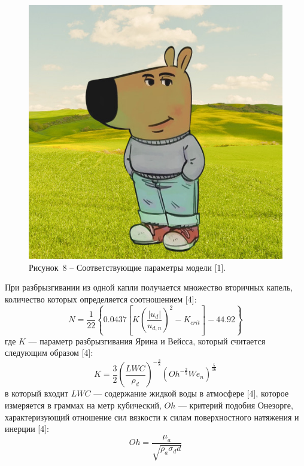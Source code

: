\begin{figure}[H]
	\centering
	\includegraphics[width=\textwidth]{figures/chill-guy.jpeg}
	\caption*{Рисунок~8 – Соответствующие параметры модели [1].}
	\label{fig:-6}
\end{figure}

При разбрызгивании из одной капли получается множество вторичных капель, количество которых определяется соотношением [4]:
\begin{equation}
	N = \frac{1}{22}\left\{0.0437\left[K\left(\frac{\left|u_d\right|}{u_{d,n}}\right)^2-K_{crit}\right]-44.92\right\}
\end{equation}  
где $K$ --- параметр разбрызгивания Ярина и Вейсса, который считается следующим образом [4]:
\begin{equation}
	K = \frac{3}{2}\left(\frac{LWC}{\rho_d}\right)^{-\frac{3}{8}}\left(Oh^{-\frac{2}{5}}We_n\right)^\frac{5}{16}
\end{equation}  
в который входит $LWC$ --- содержание жидкой воды в атмосфере [4], которое измеряется в граммах на метр кубический, $Oh$ --- критерий подобия Онезорге, характеризующий отношение сил вязкости к силам поверхностного натяжения и инерции [4]:
\begin{equation}
	Oh = \frac{\mu_a}{\sqrt{\rho_a \sigma_d d}}
\end{equation}

